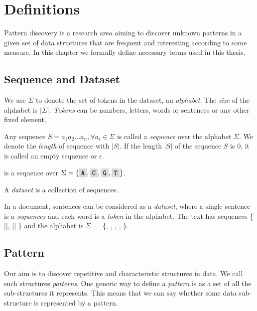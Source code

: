\chapter{Definitions}
\label{c:definitions}

Pattern discovery is a research area aiming to discover unknown patterns in a given set of data structures that are frequent and interesting according to some measure. In this chapter we formally define necessary terms used in this thesis.

\section{Sequence and Dataset}

We use $\Sigma$ to denote the set of tokens in the dataset, an \emph{alphabet}. The \emph{size} of the alphabet is $|\Sigma|$. \emph{Tokens} can be numbers, letters, words or sentences or any other fixed element.

Any sequence $S=a_1 a_2 ... a_n, \forall a_i \in \Sigma$ is called a \emph{sequence} over the alphabet $\Sigma$. We denote the \emph{length} of sequence with $|S|$. If the length $|S|$ of the sequence $S$ is $0$, it is called an empty sequence or $\epsilon$.

\begin{exmp}
 is a sequence over $\Sigma = \{\R{A}, \R{C}, \R{G}, \R{T}\}$.
\end{exmp}

A \emph{dataset} is a collection of sequences.

\begin{exmp}
In a document, sentences can be considered as a \emph{dataset}, where a single sentence is a \emph{sequences} and each word is a \emph{token} in the alphabet. The text  has sequences \{ [], [] \} and the alphabet is $\Sigma =$ \{, , , , \}.	
\end{exmp}

\section{Pattern}

Our aim is to discover repetitive and characteristic structures in data. We call such structures \emph{patterns}. One generic way to define a \emph{pattern} is as a set of all the sub-structures it represents. This means that we can say whether some data sub-structure is represented by a pattern.

